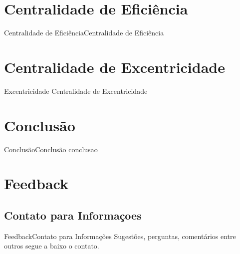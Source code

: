 \documentclass[10pt]{beamer}
\begin{document}
\section{Centralidade de Eficiência}
\begin{frame}{Centralidade de Eficiência}{Centralidade de Eficiência}

\end{frame}

\section{Centralidade de Excentricidade}
\begin{frame}{Excentricidade }{Centralidade de Excentricidade}

\end{frame}

\section{Conclusão}
\begin{frame}{Conclusão}{Conclusão}
conclusao
\end{frame}

\section{Feedback}

\subsection{Contato para Informaçoes}
\begin{frame}{Feedback}{Contato para Informações}
Sugestões, perguntas, comentários entre outros segue a baixo o contato.
\end{frame}
{\aauwavesbg
\begin{frame}
\end{frame}}
\end{document}
